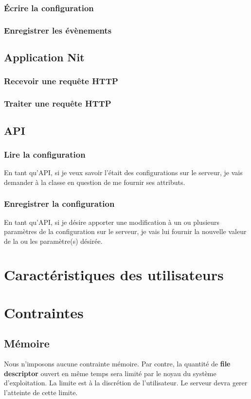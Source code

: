 \documentclass{scrreprt}
\begin{document}
\subsubsection{Écrire la configuration}

\subsubsection{Enregistrer les évènements}

\subsection{Application Nit}
\subsubsection{Recevoir une requête HTTP}

\subsubsection{Traiter une requête HTTP}

\subsection{API}
\subsubsection{Lire la configuration}
En tant qu'API, si je veux savoir l'était des configurations sur le serveur,
je vais demander à la classe en question de me fournir ses attributs.
\subsubsection{Enregistrer la configuration}
En tant qu'API, si je désire apporter une modification à un ou plusieurs
paramètres de la configuration sur le serveur, je vais lui fournir la nouvelle
valeur de la ou les paramètre(s) désirée.
\section{Caractéristiques des utilisateurs}

\section{Contraintes}

\subsection{Mémoire}
Nous n'imposons aucune contrainte mémoire. Par contre, la quantité de \textbf{file descriptor} ouvert en même temps sera limité par le noyau du système d'exploitation. La limite est à la discrétion de l'utilisateur. Le serveur devra gerer l'atteinte de cette limite.
\end{document}
